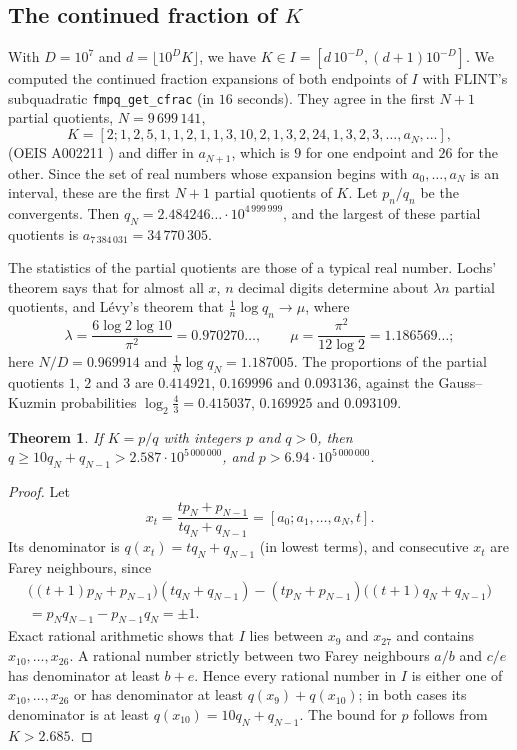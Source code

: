 \documentclass[11pt,reqno]{amsart}
\newtheorem{theorem}{Theorem}[section]
\theoremstyle{definition}
\theoremstyle{remark}
\begin{document}
\subsection{The continued fraction of $K$}\label{sec:khcf}
With $D = 10^7$ and $d = \lfloor 10^DK\rfloor$, we have $K \in I = [d\,10^{-D}, (d+1)10^{-D}]$. We computed the
continued fraction expansions of both endpoints of $I$ with FLINT's subquadratic \texttt{fmpq\_get\_cfrac} (in
$16$ seconds). They agree in the first $N + 1$ partial quotients, $N = 9\,699\,141$,
\[
  K = [2; 1, 2, 5, 1, 1, 2, 1, 1, 3, 10, 2, 1, 3, 2, 24, 1, 3, 2, 3, \ldots, a_N, \ldots],
\]
(OEIS A002211 \cite{OEIS}) and differ in $a_{N+1}$, which is $9$ for one endpoint and $26$ for the other. Since the set of
real numbers whose expansion begins with $a_0, \ldots, a_N$ is an interval, these are the first $N + 1$ partial quotients of
$K$. Let $p_n/q_n$ be the convergents. Then $q_N = 2.484246\ldots\cdot10^{4\,999\,999}$, and the largest of these
partial quotients is $a_{7\,384\,031} = 34\,770\,305$.

The statistics of the partial quotients are those of a typical real number. Lochs' theorem \cite{Loc64} says that
for almost all $x$, $n$ decimal digits determine about $\lambda n$ partial quotients, and L\'evy's theorem
\cite{Lev36} that $\frac1n\log q_n \to \mu$, where
\[
  \lambda = \frac{6\log2\log10}{\pi^2} = 0.970270\ldots, \qquad \mu = \frac{\pi^2}{12\log2} = 1.186569\ldots;
\]
here $N/D = 0.969914$ and $\frac1N\log q_N = 1.187005$. The proportions of the partial quotients $1$, $2$ and $3$ are
$0.414921$, $0.169996$ and $0.093136$, against the Gauss--Kuzmin probabilities $\log_2\frac43 = 0.415037$, $0.169925$
and $0.093109$.

\begin{theorem}\label{thm:khrat}
If $K = p/q$ with integers $p$ and $q > 0$, then $q \ge 10q_N + q_{N-1} > 2.587\cdot10^{5\,000\,000}$, and
$p > 6.94\cdot10^{5\,000\,000}$.
\end{theorem}

\begin{proof}
Let
\[
  x_t = \frac{tp_N + p_{N-1}}{tq_N + q_{N-1}} = [a_0; a_1, \ldots, a_N, t].
\]
Its denominator is $q(x_t) = tq_N + q_{N-1}$ (in lowest terms), and consecutive $x_t$ are Farey neighbours, since
\begin{multline*}
  \bigl((t+1)p_N + p_{N-1}\bigr)(tq_N + q_{N-1}) - (tp_N + p_{N-1})\bigl((t+1)q_N + q_{N-1}\bigr) \\
  = p_Nq_{N-1} - p_{N-1}q_N = \pm1.
\end{multline*}
Exact rational arithmetic shows that $I$ lies
between $x_9$ and $x_{27}$ and contains $x_{10}, \ldots, x_{26}$. A rational number strictly between two Farey
neighbours $a/b$ and $c/e$ has denominator at least $b + e$. Hence every rational number in $I$ is either one of
$x_{10}, \ldots, x_{26}$ or has denominator at least $q(x_9) + q(x_{10})$; in both cases its denominator is at least
$q(x_{10}) = 10q_N + q_{N-1}$. The bound for $p$ follows from $K > 2.685$.
\end{proof}
\end{document}

